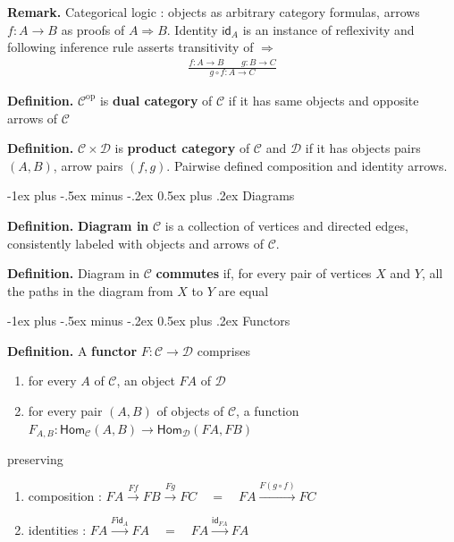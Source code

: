\documentclass[10pt,landscape,a4paper]{article}
\makeatletter
\renewcommand{\section}{\@startsection{section}{1}{0mm}%
                                {-1ex plus -.5ex minus -.2ex}%
                                {0.5ex plus .2ex}%
                                {\normalfont\large\bfseries}}
\makeatother
\begin{document}
\begin{multicols}{3}
\textbf{Remark.} Categorical logic : objects as arbitrary category formulas, arrows $f : A \rightarrow B$ as proofs of $A \Rightarrow B$. Identity $\mathsf{id}_A$ is an instance of reflexivity and following inference rule asserts transitivity of $\Rightarrow$
\vspace{-0.1cm}
\begin{eqnarray*}
\frac{f : A \rightarrow B \quad \quad g : B \rightarrow C}{g \circ f : A \rightarrow C}
\end{eqnarray*}

\textbf{Definition.} $\mathcal C^{\text{op}}$ is \textbf{dual category} of $\mathcal C$ if it  has same objects and opposite arrows of $\mathcal C$

\textbf{Definition.} $\mathcal C \times \mathcal D$ is \textbf{product category} of $\mathcal C$ and $\mathcal D$ if it has objects pairs $(A, B)$, arrow pairs $(f, g)$. Pairwise defined composition and identity arrows.

\section{Diagrams}

\textbf{Definition.} \textbf{Diagram in} $\mathcal C$ is a collection of vertices and directed edges, consistently labeled with objects and arrows of $\mathcal C$.

\textbf{Definition.} Diagram in $\mathcal C$ \textbf{commutes} if, for every pair of vertices $X$ and $Y$, all the paths in the diagram from $X$ to $Y$ are equal



\section{Functors}

\textbf{Definition.} A \textbf{functor} $F : \mathcal C \rightarrow \mathcal D$ comprises
\begin{enumerate}\setlength{\itemsep}{-0.7mm}
\item for every $A$ of $\mathcal C$, an object $FA$ of $\mathcal D$
\item for every pair $(A, B)$ of objects of $\mathcal C$, a function $F_{A, B} : \mathsf{Hom}_{\mathcal {C}} (A, B) \rightarrow \mathsf{Hom}_{\mathcal {D}} (FA, FB)$
\end{enumerate}
preserving
\begin{enumerate}\setlength{\itemsep}{-0.7mm}
\item composition : $FA \overset{F f}{\longrightarrow} FB \overset{F g}{\longrightarrow} FC \quad = \quad FA \overset{F (g \circ f)}{\longrightarrow} FC$
\item identities : $FA \overset{F \mathsf{id}_{A}}{\longrightarrow} FA \quad = \quad FA \overset{\mathsf{id}_{FA}}{\longrightarrow} FA$
\end{enumerate}


\end{multicols}
\end{document}
